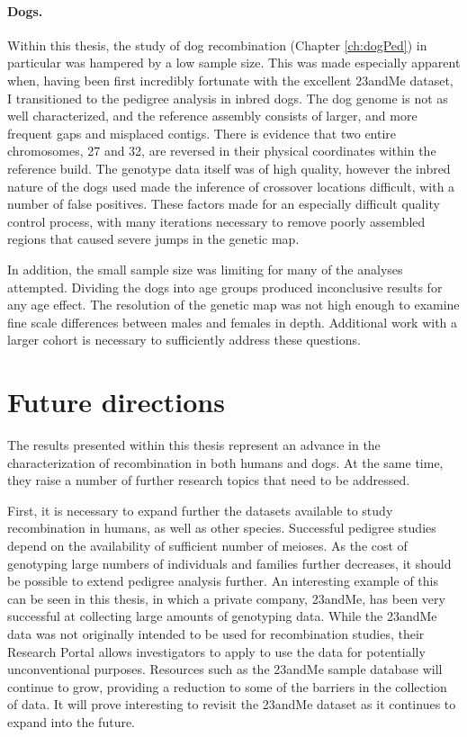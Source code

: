 \paragraph{Dogs.}
Within this thesis, the study of dog recombination (Chapter \ref{ch:dogPed}) in particular was hampered by a low sample size.
This was made especially apparent when, having been first incredibly fortunate with the excellent 23andMe dataset, I transitioned to the pedigree analysis in inbred dogs.
The dog genome is not as well characterized, and the reference assembly consists of larger, and more frequent gaps and misplaced contigs.
There is evidence that two entire chromosomes, 27 and 32, are reversed in their physical coordinates within the reference build\cite{Wong2010}.
The genotype data itself was of high quality, however the inbred nature of the dogs used made the inference of crossover locations difficult, with a number of false positives.
These factors made for an especially difficult quality control process, with many iterations necessary to remove poorly assembled regions that caused severe jumps in the genetic map.

In addition, the small sample size was limiting for many of the analyses attempted.
Dividing the dogs into age groups produced inconclusive results for any age effect.
The resolution of the genetic map was not high enough to examine fine scale differences between males and females in depth.
Additional work with a larger cohort is necessary to sufficiently address these questions.




\section{Future directions}

The results presented within this thesis represent an advance in the characterization of recombination in both humans and dogs.
At the same time, they raise a number of further research topics that need to be addressed.

First, it is necessary to expand further the datasets available to study recombination in humans, as well as other species.
Successful pedigree studies depend on the availability of sufficient number of meioses.
As the cost of genotyping large numbers of individuals and families further decreases, it should be possible to extend pedigree analysis further.
An interesting example of this can be seen in this thesis, in which a private company, 23andMe, has been very successful at collecting large amounts of genotyping data. %
While the 23andMe data was not originally intended to be used for recombination studies, their Research Portal\cite{23andMe2013} allows investigators to apply to use the data for potentially unconventional purposes.
Resources such as the 23andMe sample database will continue to grow, providing a reduction to some of the barriers in the collection of data.
It will prove interesting to revisit the 23andMe dataset as it continues to expand into the future.

